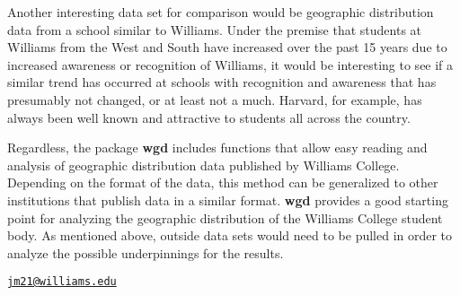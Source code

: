 Another interesting data set for comparison would be geographic
distribution data from a school similar to Williams. Under the premise
that students at Williams from the West and South have increased over
the past 15 years due to increased awareness or recognition of Williams,
it would be interesting to see if a similar trend has occurred at
schools with recognition and awareness that has presumably not changed,
or at least not a much. Harvard, for example, has always been well known
and attractive to students all across the country.

Regardless, the package \textbf{wgd} includes functions that allow easy
reading and analysis of geographic distribution data published by
Williams College. Depending on the format of the data, this method can
be generalized to other institutions that publish data in a similar
format. \textbf{wgd} provides a good starting point for analyzing the
geographic distribution of the Williams College student body. As
mentioned above, outside data sets would need to be pulled in order to
analyze the possible underpinnings for the results.

\address{%
Jackson Moss '19\\
Williams College\\
Williamstown, MA, USA\\
}
\href{mailto:jm21@williams.edu}{\nolinkurl{jm21@williams.edu}}

